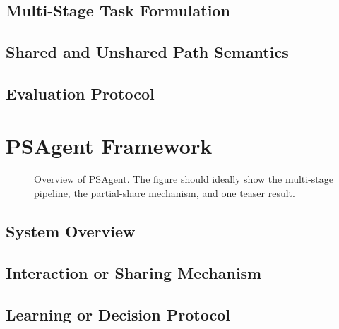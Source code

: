 \documentclass{article}
\begin{document}
\subsection{Multi-Stage Task Formulation}


\subsection{Shared and Unshared Path Semantics}


\subsection{Evaluation Protocol}


\section{PSAgent Framework}


\begin{figure}[t]
    \centering
    \fbox{\rule{0pt}{1.8in}\rule{0.98\textwidth}{0pt}}
    \caption{Overview of PSAgent. The figure should ideally show the multi-stage pipeline, the partial-share mechanism, and one teaser result.}
    \label{fig:framework}
\end{figure}

\subsection{System Overview}

\subsection{Interaction or Sharing Mechanism}

\subsection{Learning or Decision Protocol}

\end{document}
